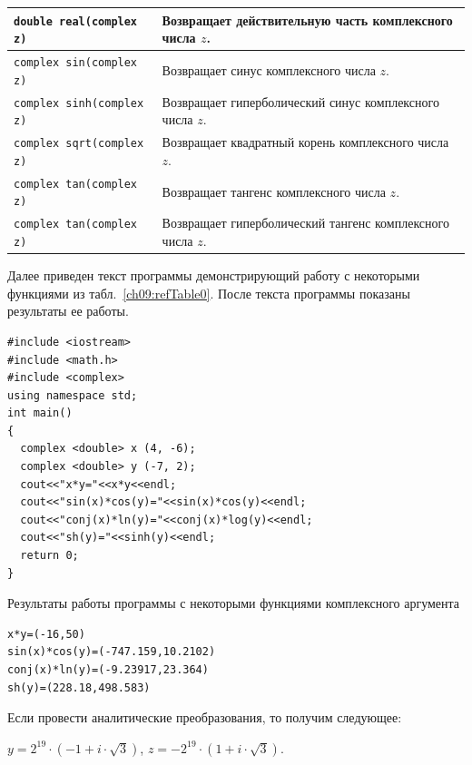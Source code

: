 {\begin{longtable}{|p{}|p{}|}
\lstinline!double real(complex z)! &Возвращает действительную часть комплексного числа $z$.\\\hline
\lstinline!complex sin(complex z)! &Возвращает синус комплексного числа $z$.\\\hline
\lstinline!complex sinh(complex z)! &Возвращает гиперболический синус комплексного числа $z$.\\\hline
\lstinline!complex sqrt(complex z)! &Возвращает квадратный корень комплексного числа $z$.\\\hline
\lstinline!complex tan(complex z)! &Возвращает тангенс  комплексного числа $z$.\\\hline
\lstinline!complex tan(complex z)! &Возвращает гиперболический тангенс комплексного числа $z$.\\\hline
\end{longtable}
}

Далее приведен текст программы демонстрирующий работу с некоторыми функциями из табл.~\ref{ch09:refTable0}. 
После текста программы
показаны результаты ее работы.%
\begin{lstlisting}
#include <iostream>
#include <math.h>
#include <complex>
using namespace std;
int main()
{
  complex <double> x (4, -6);
  complex <double> y (-7, 2);
  cout<<"x*y="<<x*y<<endl;
  cout<<"sin(x)*cos(y)="<<sin(x)*cos(y)<<endl;
  cout<<"conj(x)*ln(y)="<<conj(x)*log(y)<<endl;
  cout<<"sh(y)="<<sinh(y)<<endl;
  return 0;
}
\end{lstlisting}

Результаты работы программы с некоторыми функциями комплексного аргумента
\begin{verbatim}
x*y=(-16,50)
sin(x)*cos(y)=(-747.159,10.2102)
conj(x)*ln(y)=(-9.23917,23.364)
sh(y)=(228.18,498.583)
\end{verbatim}


Если провести аналитические преобразования, то получим следующее:

 $y=2^{19}\cdot (-1+i\cdot \sqrt{3})$,  $z=-2^{19}\cdot (1+i\cdot \sqrt{3})$.

